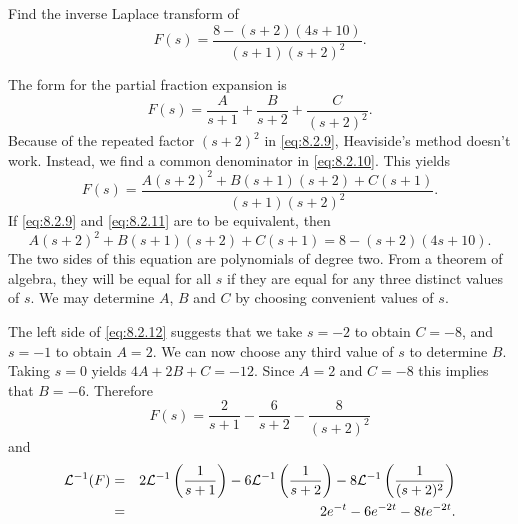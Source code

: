 \documentclass{ximera}
\begin{document}
\begin{example}\label{example:8.2.6} Find the inverse Laplace transform
of
\begin{equation}\label{eq:8.2.9}
F(s)=\frac{8-(s+2)(4s+10)}{(s+1)(s+2)^2}.
\end{equation}
\begin{solution}
The  form for the partial fraction expansion  is
\begin{equation}\label{eq:8.2.10}
F(s)=\frac{A}{s+1}+\frac{B}{s+2}+\frac{C}{(s+2)^2}.
\end{equation}
Because of the repeated factor $(s+2)^2$ in \eqref{eq:8.2.9}, Heaviside's
method doesn't work. Instead, we find a common denominator in
\eqref{eq:8.2.10}. This yields
\begin{equation}\label{eq:8.2.11}
F(s)=\frac{A(s+2)^2+B(s+1)(s+2)+C(s+1)}{(s+1)(s+2)^2}.
\end{equation}
If  \eqref{eq:8.2.9} and  \eqref{eq:8.2.11} are to be equivalent, then
\begin{equation}\label{eq:8.2.12}
A(s+2)^2+B(s+1)(s+2)+C(s+1)=8-(s+2)(4s+10).
\end{equation}
The two sides of this equation are polynomials of degree two. From a
theorem of algebra, they will be equal for all $s$ if they are equal
for any three distinct values of $s$. We may determine $A$, $B$ and
$C$ by choosing convenient values of $s$.

The left side of \eqref{eq:8.2.12} suggests that we take $s=-2$ to obtain
$C=-8$, and $s=-1$ to obtain $A=2$. We can now choose any third value
of $s$ to determine $B$. Taking $s=0$ yields $4A+2B+C=-12$. Since
$A=2$ and $C=-8$ this implies that $B=-6$. Therefore
$$
F(s)=\frac{2}{s+1}-\frac{6}{s+2}-\frac{8}{(s+2)^2}
$$
and
\begin{eqnarray*}
{\cal L}^{-1}(F)&=&
2{\cal L}^{-1}\left(\frac{1}{s+1}\right)-6{\cal L}^{-1}\left(\frac{1}{s+2}\right)-8{\cal L}^{-1}\left(\frac{1}{(s+2)^2}\right)\\
&=&2e^{-t}-6e^{-2t}-8te^{-2t}.
\end{eqnarray*}
\end{solution}
\end{example}
\end{document}
